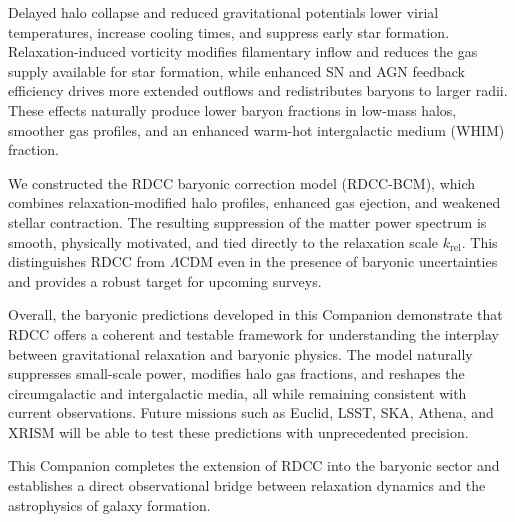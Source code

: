 \documentclass[11pt,a4paper]{article}
\begin{document}
Delayed halo collapse and reduced gravitational potentials lower virial temperatures,
increase cooling times, and suppress early star formation. Relaxation-induced vorticity modifies
filamentary inflow and reduces the gas supply available for star formation, while enhanced SN
and AGN feedback efficiency drives more extended outflows and redistributes baryons to larger
radii. These effects naturally produce lower baryon fractions in low-mass halos, smoother gas
profiles, and an enhanced warm-hot intergalactic medium (WHIM) fraction.

We constructed the RDCC baryonic correction model (RDCC-BCM), which combines
relaxation-modified halo profiles, enhanced gas ejection, and weakened stellar contraction.
The resulting suppression of the matter power spectrum is smooth, physically motivated, and
tied directly to the relaxation scale $k_{\mathrm{rel}}$. This distinguishes RDCC from
$\Lambda$CDM even in the presence of baryonic uncertainties and provides a robust target for
upcoming surveys.

Overall, the baryonic predictions developed in this Companion demonstrate that RDCC
offers a coherent and testable framework for understanding the interplay between gravitational
relaxation and baryonic physics. The model naturally suppresses small-scale power, modifies
halo gas fractions, and reshapes the circumgalactic and intergalactic media, all while remaining
consistent with current observations. Future missions such as Euclid, LSST, SKA, Athena, and
XRISM will be able to test these predictions with unprecedented precision.

This Companion completes the extension of RDCC into the baryonic sector and establishes
a direct observational bridge between relaxation dynamics and the astrophysics of galaxy
formation.
\end{document}
